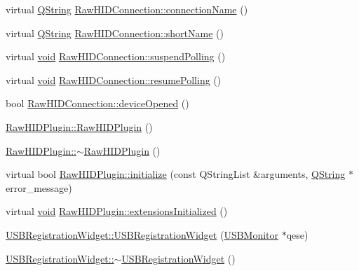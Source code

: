 \begin{DoxyCompactItemize}
\item 
virtual \hyperlink{group___u_a_v_objects_plugin_gab9d252f49c333c94a72f97ce3105a32d}{Q\-String} \hyperlink{group___raw_h_i_d_plugin_ga753e060b5d2c26ebd344c084750bf715}{Raw\-H\-I\-D\-Connection\-::connection\-Name} ()
\item 
virtual \hyperlink{group___u_a_v_objects_plugin_gab9d252f49c333c94a72f97ce3105a32d}{Q\-String} \hyperlink{group___raw_h_i_d_plugin_gadf376fe560ac0b2e750fd4797139f602}{Raw\-H\-I\-D\-Connection\-::short\-Name} ()
\item 
virtual \hyperlink{group___u_a_v_objects_plugin_ga444cf2ff3f0ecbe028adce838d373f5c}{void} \hyperlink{group___raw_h_i_d_plugin_gac46703708a7e43cffa7712ebab818ba0}{Raw\-H\-I\-D\-Connection\-::suspend\-Polling} ()
\item 
virtual \hyperlink{group___u_a_v_objects_plugin_ga444cf2ff3f0ecbe028adce838d373f5c}{void} \hyperlink{group___raw_h_i_d_plugin_gabe7a095aa167ae8addf65d14e2dcc460}{Raw\-H\-I\-D\-Connection\-::resume\-Polling} ()
\item 
bool \hyperlink{group___raw_h_i_d_plugin_ga9bd370fd09da409d89f1dd7612d482cb}{Raw\-H\-I\-D\-Connection\-::device\-Opened} ()
\item 
\hyperlink{group___raw_h_i_d_plugin_gab33af7d70867d692cd24d8f740449278}{Raw\-H\-I\-D\-Plugin\-::\-Raw\-H\-I\-D\-Plugin} ()
\item 
\hyperlink{group___raw_h_i_d_plugin_ga0201928dc19d45a2e3771f6631af7fd5}{Raw\-H\-I\-D\-Plugin\-::$\sim$\-Raw\-H\-I\-D\-Plugin} ()
\item 
virtual bool \hyperlink{group___raw_h_i_d_plugin_ga52bbfe9d4f2cd93a959bdd723438e522}{Raw\-H\-I\-D\-Plugin\-::initialize} (const Q\-String\-List \&arguments, \hyperlink{group___u_a_v_objects_plugin_gab9d252f49c333c94a72f97ce3105a32d}{Q\-String} $\ast$error\-\_\-message)
\item 
virtual \hyperlink{group___u_a_v_objects_plugin_ga444cf2ff3f0ecbe028adce838d373f5c}{void} \hyperlink{group___raw_h_i_d_plugin_ga59b1e6d264de04d48bb83b823f91a5fe}{Raw\-H\-I\-D\-Plugin\-::extensions\-Initialized} ()
\item 
\hyperlink{group___raw_h_i_d_plugin_gaeaf0fb927142afa4e4233bfbd8fcb989}{U\-S\-B\-Registration\-Widget\-::\-U\-S\-B\-Registration\-Widget} (\hyperlink{class_u_s_b_monitor}{U\-S\-B\-Monitor} $\ast$qese)
\item 
\hyperlink{group___raw_h_i_d_plugin_gaba711458acab7c2f26fbe576a10291c2}{U\-S\-B\-Registration\-Widget\-::$\sim$\-U\-S\-B\-Registration\-Widget} ()
\item 

\end{DoxyCompactItemize}
